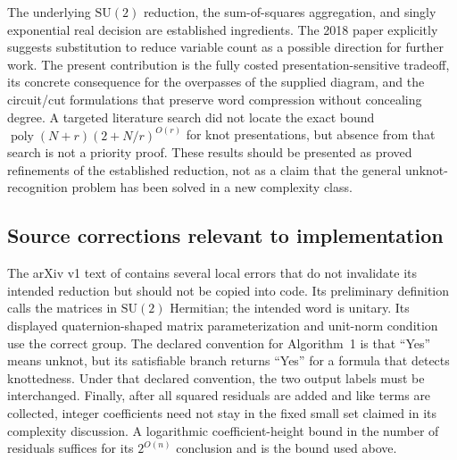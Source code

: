 The underlying $\mathrm{SU}(2)$ reduction, the sum-of-squares aggregation,
and singly exponential real decision are established ingredients.  The
2018 paper explicitly suggests substitution to reduce variable count as a
possible direction for further work.  The present contribution is the
fully costed presentation-sensitive tradeoff, its concrete consequence for
the overpasses of the supplied diagram, and the circuit/cut formulations
that preserve word compression without concealing degree.  A targeted
literature search did not locate the exact bound
$\operatorname{poly}(N+r)(2+N/r)^{O(r)}$ for knot presentations, but
absence from that search is not a priority proof.  These results should be
presented as proved refinements of the established reduction, not as a
claim that the general unknot-recognition problem has been solved in a
new complexity class.

\subsection{Source corrections relevant to implementation}

The arXiv v1 text of \cite{MP2018} contains several local errors that do
not invalidate its intended reduction but should not be copied into code.
Its preliminary definition calls the matrices in $\mathrm{SU}(2)$
Hermitian; the intended word is unitary.  Its displayed quaternion-shaped
matrix parameterization and unit-norm condition use the correct group.
The declared convention for Algorithm~1 is that ``Yes'' means unknot,
but its satisfiable branch returns ``Yes'' for a formula that detects
knottedness.  Under that declared convention, the two output labels must
be interchanged.  Finally, after all squared residuals are added and like
terms are collected, integer coefficients need not stay in the fixed
small set claimed in its complexity discussion.  A logarithmic
coefficient-height bound in the number of residuals suffices for its
$2^{O(n)}$ conclusion and is the bound used above.

